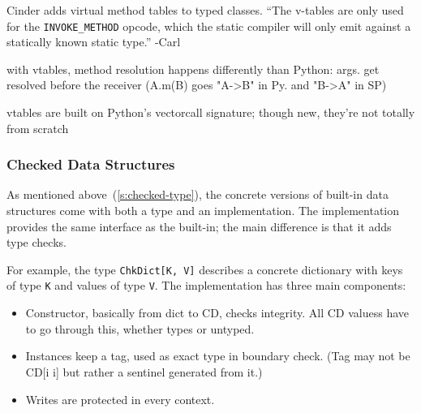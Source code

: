 \documentclass[english,cleveref,submission]{programming}
\newcommand{\code}[1]{\texttt{#1}}
\begin{document}
Cinder adds virtual method tables to typed classes.
``The v-tables are only used for the \code{INVOKE\_METHOD} opcode, which
the static compiler will only emit against a statically known static type.'' -Carl

with vtables, method resolution happens differently than Python: args. get
resolved before the receiver (A.m(B) goes "A->B" in Py. and "B->A" in SP)

vtables are built on Python's vectorcall signature; though new, they're not
totally from scratch

%


\subsubsection{Checked Data Structures}
\label{s:chkdict-impl}

As mentioned above~(\cref{s:checked-type}), the concrete versions of built-in data structures
come with both a type and an implementation.
The implementation provides the same interface as the built-in;
the main difference is that it adds type checks.

For example, the type \code{ChkDict[K, V]} describes a concrete dictionary
with keys of type \code{K} and values of type \code{V}.
The implementation has three main components:
\begin{itemize}
  \item
    Constructor, basically from dict to CD, checks integrity.
    All CD valuess have to go through this, whether types or untyped.
  \item
    Instances keep a tag, used as exact type in boundary check.
    (Tag may not be CD[i i] but rather a sentinel generated from it.)
  \item
    Writes are protected in every context.
\end{itemize}
\end{document}
